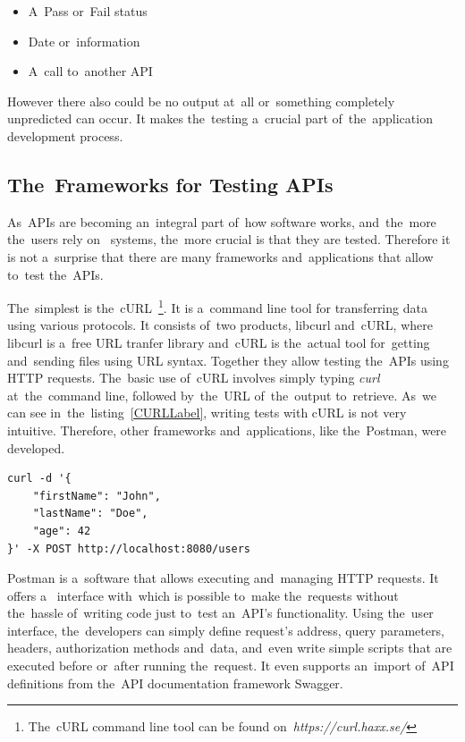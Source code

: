 \begin{itemize}
  \item A~Pass or~Fail status
  \item Date or~information
  \item A~call to~another API
\end{itemize}

However there also could be no output at~all or~something completely unpredicted
can occur. It makes the~testing a~crucial part of~the~application development
process.

\subsection{The~Frameworks for Testing APIs}
\label{frameworks}
As~APIs are becoming an~integral part of~how software works, and~the~more
the~users rely on~ systems, the~more crucial is that they are
tested. Therefore it is not a~surprise that there are many frameworks
and~applications that allow to~test the~APIs.

The~simplest is the~cURL~\footnote{The~cURL command line tool can be found
on~\textit{https://curl.haxx.se/}}.
It is a~command line tool for transferring data using various protocols. It
consists of~two products, libcurl and~cURL, where libcurl is a~free  URL tranfer library and~cURL is
the~actual tool for~getting and~sending files using URL syntax. Together they
allow testing the~APIs using HTTP requests. The~basic use of~cURL involves
simply typing \textit{curl} at~the~command line, followed by~the~URL
of~the~output to~retrieve. As~we can see in~the~listing~\ref{CURLLabel}, writing tests with cURL is not
very intuitive. Therefore, other frameworks and~applications, like the~Postman,
were developed.

\vspace{2mm}
\begin{lstlisting}[caption=An~example of~POST request that creates new user
on~the~server using cURL.,label=CURLLabel,language=XML]
curl -d '{
	"firstName": "John",
	"lastName": "Doe",
	"age": 42
}' -X POST http://localhost:8080/users
\end{lstlisting}

Postman is a~software that allows executing and~managing HTTP requests. It
offers a~ interface with~which is possible to~make
the~requests without the~hassle of~writing code just to~test an~API's
functionality. Using the~user interface, the~developers can simply define
request's address, query parameters, headers, authorization methods and~data,
and~even write simple scripts that are executed before or~after running
the~request. It even supports an~import of~API definitions from the~API
documentation framework Swagger.

